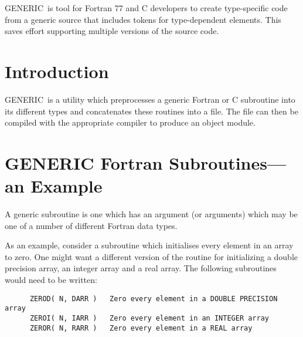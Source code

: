 \documentclass[twoside,11pt]{article}
\newcommand{\stardocinitials}  {SUN}
\newcommand{\stardocnumber}    {7.5}
\newcommand{\stardocname}{\stardocinitials /\stardocnumber}
\renewcommand{\_}{{\tt\char'137}}     %
\newenvironment{latexonly}{}{}
\newcommand{\latexonlytoc}[0]{\tableofcontents}
\newcommand{\GENERIC}{{\footnotesize GENERIC}\normalsize}
\renewcommand{\thepage}{\roman{page}}
\begin{document}
\GENERIC\ is tool for Fortran 77 and C developers to create type-specific
code from a generic source that includes tokens for type-dependent
elements.  This saves effort supporting multiple versions of the 
source code.

 \newpage
 \begin{latexonly}
   \setlength{\parskip}{0mm}
   \latexonlytoc
   \setlength{\parskip}{\medskipamount}
   \markboth{\stardocname}{\stardocname}
 \end{latexonly}
\cleardoublepage
\renewcommand{\thepage}{\arabic{page}}
\setcounter{page}{1}


\section{Introduction}

\GENERIC\ is a utility which preprocesses a generic Fortran or C 
subroutine into its different types and concatenates these routines 
into a file.  The file can then be compiled with the appropriate
compiler to produce an object module.

\section{GENERIC Fortran Subroutines---an Example}

A generic subroutine is one which has an argument (or arguments)
which may be one of a number of different Fortran data types.

As an example, consider a subroutine which initialises every
element in an array to zero. 
One might want a different version of the routine for initializing
a double precision array, an integer array and a real array.
The following subroutines would need to be written:

\begin{verbatim}
      ZEROD( N, DARR )   Zero every element in a DOUBLE PRECISION array
      ZEROI( N, IARR )   Zero every element in an INTEGER array
      ZEROR( N, RARR )   Zero every element in a REAL array
\end{verbatim}
\end{document}
